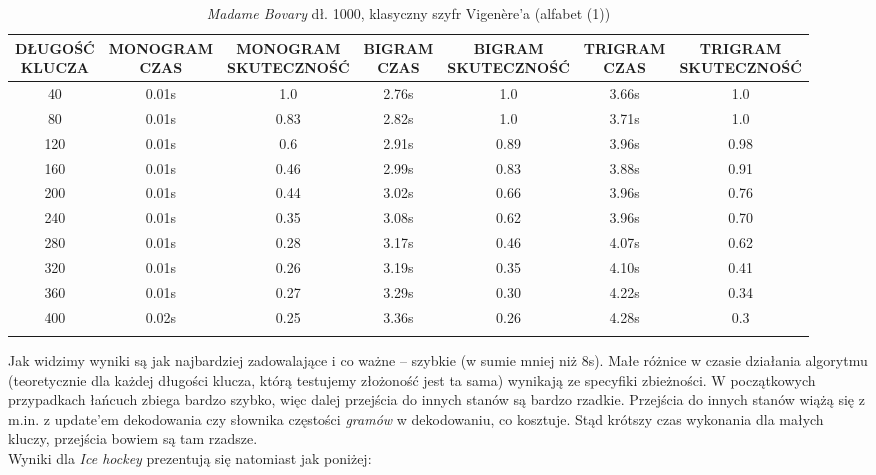 \documentclass[a4paper]{article}
\theoremstyle{defn}
\theoremstyle{theorem}
\theoremstyle{lemma}
\theoremstyle{cor}
\theoremstyle{fact}
\begin{document}
\begin{center}\begin{small}\begin{longtable}{|c|c|c|c|c|c|c|} 
\hline \makecell{DŁUGOŚĆ\\KLUCZA} &  \makecell{MONOGRAM\\CZAS} & \makecell{MONOGRAM\\SKUTECZNOŚĆ} & \makecell{BIGRAM\\CZAS} &  \makecell{BIGRAM\\SKUTECZNOŚĆ} & \makecell{TRIGRAM\\CZAS} & \makecell{TRIGRAM\\SKUTECZNOŚĆ}\\ \hline 
40 & 0.01s & 1.0 & 2.76s & 1.0 & 3.66s & 1.0 \\ \hline 
80 & 0.01s & 0.83 & 2.82s & 1.0 & 3.71s & 1.0 \\ \hline 
120 & 0.01s & 0.6 & 2.91s & 0.89 & 3.96s & 0.98 \\ \hline 
160 & 0.01s & 0.46 & 2.99s & 0.83 & 3.88s & 0.91 \\ \hline 
200 & 0.01s & 0.44 & 3.02s & 0.66 & 3.96s & 0.76 \\ \hline 
240 & 0.01s & 0.35 & 3.08s & 0.62 & 3.96s & 0.70 \\ \hline 
280 & 0.01s & 0.28 & 3.17s & 0.46 & 4.07s & 0.62 \\ \hline 
320 & 0.01s & 0.26 & 3.19s & 0.35 & 4.10s & 0.41 \\ \hline 
360 & 0.01s & 0.27 & 3.29s & 0.30 & 4.22s & 0.34 \\ \hline 
400 & 0.02s & 0.25 & 3.36s & 0.26 & 4.28s & 0.3 \\ \hline 
\caption{\textit{Madame Bovary} dł. 1000, klasyczny szyfr Vigenère'a (alfabet (1))}
\end{longtable}\end{small}\end{center} 
Jak widzimy wyniki są jak najbardziej zadowalające i co ważne – szybkie (w sumie mniej niż 8s). Małe różnice w czasie działania algorytmu (teoretycznie dla każdej długości klucza, którą testujemy złożoność jest ta sama) wynikają ze specyfiki zbieżności. W początkowych przypadkach łańcuch zbiega bardzo szybko, więc dalej przejścia do innych stanów są bardzo rzadkie. Przejścia do innych stanów wiążą się z m.in. z update'em dekodowania czy słownika częstości \textit{gramów} w dekodowaniu, co kosztuje. Stąd krótszy czas wykonania dla małych kluczy, przejścia bowiem są tam rzadsze.\\
Wyniki dla \textit{Ice hockey} prezentują się natomiast jak poniżej:
\end{document}
